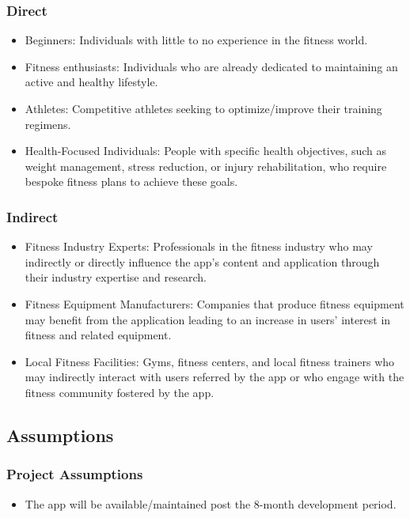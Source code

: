 \documentclass[12pt]{article}
\begin{document}
\subsubsection{Direct}
\begin{itemize}
  \item Beginners: Individuals with little to no experience in the fitness world.
  \item Fitness enthusiasts: Individuals who are already dedicated to maintaining an active and healthy lifestyle.
  \item Athletes: Competitive athletes seeking to optimize/improve their training regimens.
  \item Health-Focused Individuals: People with specific health objectives, such as weight management, stress reduction, or injury rehabilitation, who require bespoke fitness plans to achieve these goals.
\end{itemize}

\subsubsection{Indirect}
\begin{itemize}
  \item Fitness Industry Experts: Professionals in the fitness industry who may indirectly or directly influence the app’s content and application through their industry expertise and research.
  \item Fitness Equipment Manufacturers: Companies that produce fitness equipment may benefit from the application leading to an increase in users’ interest in fitness and related equipment.
  \item Local Fitness Facilities: Gyms, fitness centers, and local fitness trainers who may indirectly interact with users referred by the app or who engage with the fitness community fostered by the app.
\end{itemize}

\subsection{Assumptions}

\subsubsection{Project Assumptions}
\begin{itemize}
  \item The app will be available/maintained post the 8-month development period.
\end{itemize}
\end{document}

